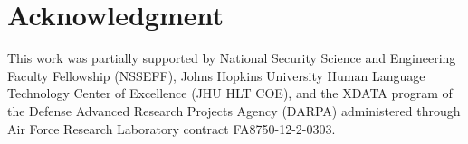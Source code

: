 \documentclass[12pt]{article}
\begin{document}
\section*{Acknowledgment}
This work was partially supported by National Security Science and Engineering Faculty Fellowship (NSSEFF),
 Johns Hopkins University Human Language Technology Center of Excellence (JHU HLT COE), and the
 XDATA program of the Defense Advanced Research Projects Agency (DARPA) administered through Air Force Research Laboratory contract FA8750-12-2-0303.




\end{document}
